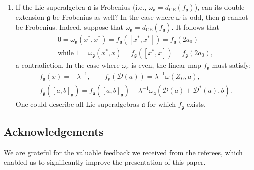\documentclass[pdftex]{sigma}
\numberwithin{equation}{section}
\begin{document}
\begin{enumerate}
 \item[(5)] If the Lie superalgebra $\mathfrak{a}$ is Frobenius (i.e., $\omega_\mathfrak{a}=d_{\text{CE}}(f_\mathfrak{a}) $), can its double extension $\mathfrak{g}$ be Frobenius as well? In the case where $\omega $ is odd, then $\mathfrak{g}$ cannot be Frobenius. Indeed, suppose that $\omega_\mathfrak{g}=d_{\text{CE}}(f_\mathfrak{g})$. It follows that
\begin{gather*}
0=\omega_\mathfrak{g}(x^*, x^*)=f_\mathfrak{g} ([x^*, x^*])= f_\mathfrak{g} (2 a_0) \\ \text{while} \ 1= \omega_\mathfrak{g}(x^*, x)=f_\mathfrak{g} ([x^*, x])=f_\mathfrak{g} (2 a_0),
\end{gather*}
a contradiction. In the case where $\omega_\mathfrak{a}$ is even, the linear map $f_\mathfrak{g}$ must satisfy:
\begin{gather*}
f_\mathfrak{g}(x) = -\lambda^{-1}, \qquad f_\mathfrak{g} ({\mathscr D}(a))= \lambda^{-1} \omega (Z_\Omega, a), \\ f_\mathfrak{g}([a,b]_\mathfrak{a})=f_\mathfrak{a} ([a,b]_\mathfrak{a}) +\lambda^{-1} \omega_\mathfrak{a} ({\mathscr D} (a)+{\mathscr D}^* (a), b).
\end{gather*}
One could describe all Lie superalgebras $\mathfrak{a}$ for which $f_\mathfrak{g}$ exists.
\end{enumerate}

\subsection*{Acknowledgements}
We are grateful for the valuable feedback we received from the referees, which enabled us to significantly improve the presentation of this paper.
\end{document}
